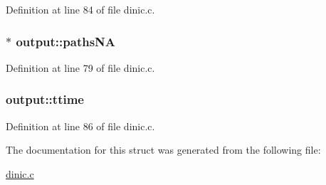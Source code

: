 Definition at line 84 of file dinic.c.

\hypertarget{structoutput_a86f2f616dc4828be22de10d4d36fc353}{
\subsubsection[{pathsNA}]{$\ast$ {\bf output::pathsNA}}}
\label{structoutput_a86f2f616dc4828be22de10d4d36fc353}


Definition at line 79 of file dinic.c.

\hypertarget{structoutput_a4fe5134901a07f53d54989c1c90fb221}{
\subsubsection[{ttime}]{ {\bf output::ttime}}}
\label{structoutput_a4fe5134901a07f53d54989c1c90fb221}


Definition at line 86 of file dinic.c.



The documentation for this struct was generated from the following file:\begin{DoxyCompactItemize}
\item 
\hyperlink{dinic_8c}{dinic.c}\end{DoxyCompactItemize}
